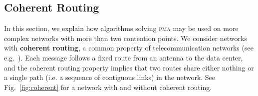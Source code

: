 \documentclass[a4paper,UKenglish,cleveref, autoref, thm-restate]{lipics-v2019}
\newcommand\pma{\textsc{pma}\xspace}
\begin{document}
\subsection{Coherent Routing}\label{sec:coherent}

In this section, we explain how algorithms solving \pma may be used on more complex networks with more than two contention points.
We consider networks with \textbf{coherent routing}, a common property of telecommunication networks (see e.g.~\cite{Schwiebert1996ANA}).
Each message follows a fixed route from an antenna to the data center, and the coherent routing property implies that two routes share either nothing or a single path (i.e. a sequence of contiguous links) in the network. See Fig.~\ref{fig:coherent} for a network with and without coherent routing.

\begin{figure}
\begin{center}
\begin{minipage}[c]{.45\linewidth}
\end{minipage}
\end{center}
\end{figure}
\end{document}

